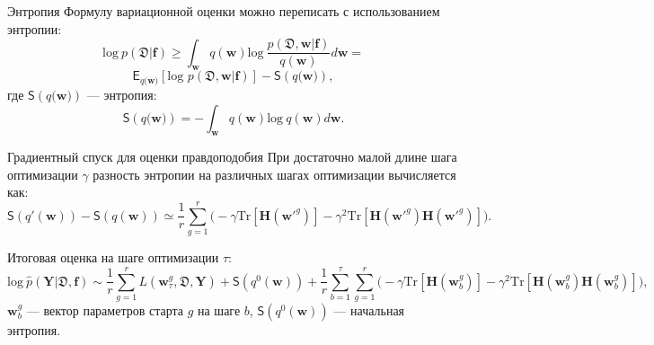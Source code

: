 \documentclass[10pt,pdf,utf8,russian,aspectratio=169]{beamer}
\begin{document}
\begin{frame}{Энтропия}
Формулу вариационной оценки можно переписать с использованием энтропии:
$$\text{log}~p(\mathfrak{D}|\mathbf{f}) \geq 
\int_{\mathbf{w}} q(\mathbf{w})\text{log}~\frac{p(\mathfrak{D},\mathbf{w}|\mathbf{f})}{q(\mathbf{w})}d\mathbf{w} = 
$$
$$
\mathsf{E}_{q(\mathbf{w)}}[\text{log~}p (\mathfrak{D}, \mathbf{w}| \mathbf{f})] - \mathsf{S}({q(\mathbf{w)}}),
$$
где $\mathsf{S}({q(\mathbf{w)}})$ --- энтропия:
$$
\mathsf{S}({q(\mathbf{w)}}) = - \int_{\mathbf{w}} q(\mathbf{w})\text{log}~q(\mathbf{w})d\mathbf{w}.  	
$$
\end{frame}




\begin{frame}{Градиентный спуск для оценки правдоподобия}
При достаточно малой длине шага оптимизации $\gamma$ разность энтропии на различных шагах оптимизации вычисляется как:
\[
\mathsf{S}(q'(\mathbf{w})) -  \mathsf{S}(q(\mathbf{w}))  \simeq  \frac{1}{r}\sum_{g=1}^r \bigl(-\gamma \text{Tr}[\mathbf{H}(\mathbf{w}'^g)] - \gamma^2 \text{Tr}[\mathbf{H}(\mathbf{w}'^g)\mathbf{H}(\mathbf{w}'^g)]  \bigr).
\]

Итоговая оценка на шаге оптимизации $\tau$:
$$
\text{log}~\hat{p}(\mathbf{Y}|\mathfrak{D}, \mathbf{f}) \sim \frac{1}{r} \sum_{g = 1}^r L(\mathbf{w}^g_\tau, \mathfrak{D}, \mathbf{Y})  + \mathsf{S}(q^0(\mathbf{w})) + \frac{1}{r}\sum_{b=1}^\tau\sum_{g=1}^r \bigl(-\gamma \text{Tr}[\mathbf{H}(\mathbf{w}_b^g)] - \gamma^2 \text{Tr}[\mathbf{H}(\mathbf{w}_b^g)\mathbf{H}(\mathbf{w}_b^g)]  \bigr),
$$
$\mathbf{w}_b^g$ --- вектор параметров старта $g$ на шаге $b$, $\mathsf{S}(q^0(\mathbf{w}))$ --- начальная энтропия.
\end{frame}
\end{document}

